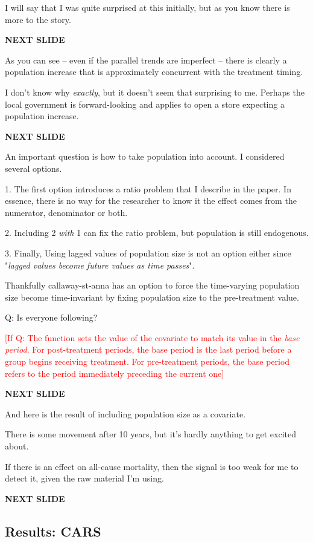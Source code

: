 \documentclass[12pt]{article}
\newcommand{\TODO}[1]{\textcolor{red}{[#1]}}
\begin{document}
I will say that I was quite surprised at this initially, but as you know there is more to the story. 

\textbf{NEXT SLIDE}

As you can see -- even if the parallel trends are imperfect -- there is clearly a population increase that is approximately concurrent with the treatment timing. 

I don't know why \emph{exactly}, but it doesn't seem that surprising to me. Perhaps the local government is forward-looking and applies to open a store expecting a population increase.

\textbf{NEXT SLIDE}

An important question is how to take population into account. I considered several options. 

1. The first option introduces a ratio problem that I describe in the paper. In essence, there is no way for the researcher to know it the effect comes from the numerator, denominator or both. 

2. Including 2 \emph{with} 1 can fix the ratio problem, but population is still endogenous. 

3. Finally, Using lagged values of population size is not an option either since "\emph{lagged values become future values as time passes}".

Thankfully callaway-st-anna has an option to force the time-varying population size become time-invariant by fixing population size to the pre-treatment value. 

Q: Is everyone following?



\TODO{If Q: The function sets the value of the covariate to match its value in the \emph{base period}. For post-treatment periods, the base period is the last period before a group begins receiving treatment. For pre-treatment periods, the base period refers to the period immediately preceding the current one}

\textbf{NEXT SLIDE}

And here is the result of including population size as a covariate.

There is some movement after 10 years, but it's hardly anything to get excited about. 

If there is an effect on all-cause mortality, then the signal is too weak for me to detect it, given the raw material I'm using.

\textbf{NEXT SLIDE}

\subsection{Results: CARS}
\end{document}
